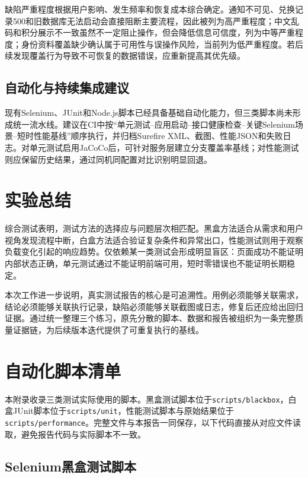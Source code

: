 \documentclass[bwprint]{report}
\begin{document}
缺陷严重程度根据用户影响、发生频率和恢复成本综合确定。通知不可见、兑换记录500和旧数据库无法启动会直接阻断主要流程，因此被列为高严重程度；中文乱码和积分展示不一致虽然不一定阻止操作，但会降低信息可信度，列为中等严重程度；身份资料覆盖缺少确认属于可用性与误操作风险，当前列为低严重程度。若后续发现覆盖行为导致不可恢复的数据错误，应重新提高其优先级。

\subsection{自动化与持续集成建议}
现有Selenium、JUnit和Node.js脚本已经具备基础自动化能力，但三类脚本尚未形成统一流水线。建议在CI中按“单元测试--应用启动--接口健康检查--关键Selenium场景--短时性能基线”顺序执行，并归档Surefire XML、截图、性能JSON和失败日志。对单元测试启用JaCoCo后，可针对服务层建立分支覆盖率基线；对性能测试则应保留历史结果，通过同机同配置对比识别明显回退。

\section{实验总结}
综合测试表明，测试方法的选择应与问题层次相匹配。黑盒方法适合从需求和用户视角发现流程中断，白盒方法适合验证复杂条件和异常出口，性能测试则用于观察负载变化引起的响应趋势。仅依赖某一类测试会形成明显盲区：页面成功不能证明内部状态正确，单元测试通过不能证明前端可用，短时零错误也不能证明长期稳定。

本次工作进一步说明，真实测试报告的核心是可追溯性。用例必须能够关联需求，结论必须能够关联执行记录，缺陷必须能够关联截图或日志，修复后还应给出回归证据。通过统一整理三个练习，原先分散的脚本、数据和报告被组织为一条完整质量证据链，为后续版本迭代提供了可重复执行的基线。

\clearpage
\appendix
\section{自动化脚本清单}
本附录收录三类测试实际使用的脚本。黑盒测试脚本位于\texttt{scripts/blackbox}，白盒JUnit脚本位于\texttt{scripts/unit}，性能测试脚本与原始结果位于\texttt{scripts/performance}。完整文件与本报告一同保存，以下代码直接从对应文件读取，避免报告代码与实际脚本不一致。

\subsection{Selenium黑盒测试脚本}
\end{document}
